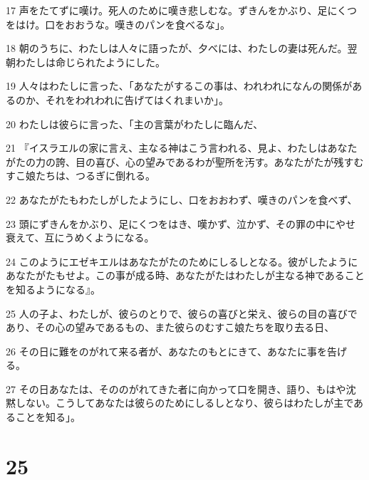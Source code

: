 \par 17 声をたてずに嘆け。死人のために嘆き悲しむな。ずきんをかぶり、足にくつをはけ。口をおおうな。嘆きのパンを食べるな」。
\par 18 朝のうちに、わたしは人々に語ったが、夕べには、わたしの妻は死んだ。翌朝わたしは命じられたようにした。
\par 19 人々はわたしに言った、「あなたがするこの事は、われわれになんの関係があるのか、それをわれわれに告げてはくれまいか」。
\par 20 わたしは彼らに言った、「主の言葉がわたしに臨んだ、
\par 21 『イスラエルの家に言え、主なる神はこう言われる、見よ、わたしはあなたがたの力の誇、目の喜び、心の望みであるわが聖所を汚す。あなたがたが残すむすこ娘たちは、つるぎに倒れる。
\par 22 あなたがたもわたしがしたようにし、口をおおわず、嘆きのパンを食べず、
\par 23 頭にずきんをかぶり、足にくつをはき、嘆かず、泣かず、その罪の中にやせ衰えて、互にうめくようになる。
\par 24 このようにエゼキエルはあなたがたのためにしるしとなる。彼がしたようにあなたがたもせよ。この事が成る時、あなたがたはわたしが主なる神であることを知るようになる』。
\par 25 人の子よ、わたしが、彼らのとりで、彼らの喜びと栄え、彼らの目の喜びであり、その心の望みであるもの、また彼らのむすこ娘たちを取り去る日、
\par 26 その日に難をのがれて来る者が、あなたのもとにきて、あなたに事を告げる。
\par 27 その日あなたは、そののがれてきた者に向かって口を開き、語り、もはや沈黙しない。こうしてあなたは彼らのためにしるしとなり、彼らはわたしが主であることを知る」。

\chapter{25}

